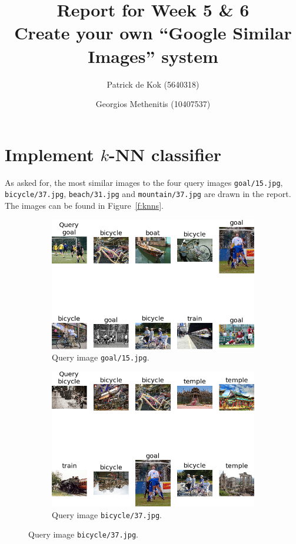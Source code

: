 \documentclass[a4paper,10pt]{article}
\title{Report for Week 5 \& 6\\\normalsize Create your own ``Google Similar Images'' system}
\author{Patrick de Kok (5640318) \and Georgios Methenitis (10407537)}
\begin{document}
\maketitle
\thispagestyle{empty}

\section{Implement $k$-NN classifier}
As asked for, the most similar images to the four query images \texttt{goal/15.jpg}, \texttt{bicycle/37.jpg}, \texttt{beach/31.jpg} and \texttt{mountain/37.jpg} are drawn in the report.  The images can be found in Figure~\ref{f:knns}.

\begin{figure}
  \begin{subfigure}{.47\textwidth}
    \centering
    \includegraphics[width=1\textwidth]{knn_goal15}
    \caption{Query image \texttt{goal/15.jpg}.}
  \end{subfigure}
  \hspace*{\fill}
  \begin{subfigure}{.47\textwidth}
    \centering
    \includegraphics[width=1\textwidth]{knn_bicycle37}
    \caption{Query image \texttt{bicycle/37.jpg}.}
  \end{subfigure}


\end{figure}
\end{document}
